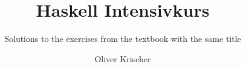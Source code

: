 \documentclass{scrreprt}
\numberwithin{equation}{chapter}
\begin{document}
\title{Haskell Intensivkurs}
\author{Oliver Krischer}
\subtitle{Solutions to the exercises from the textbook with the same title }
\maketitle
\tableofcontents
\setcounter{chapter}{1}



\printbibliography
\end{document}
